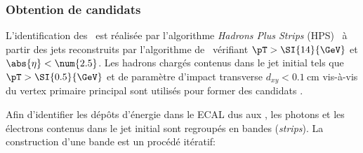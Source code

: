 \subsubsection{Obtention de candidats}
L'identification des \tauh\ est réalisée par l'algorithme \emph{Hadrons Plus Strips} (HPS)~\cite{Khachatryan:2015dfa,Sirunyan:2018pgf} à partir des jets reconstruits par l'algorithme de \PF\ vérifiant $\pT>\SI{14}{\GeV}$ et $\abs{\eta}<\num{2.5}$.
Les hadrons chargés contenus dans le jet initial tels que $\pT>\SI{0.5}{\GeV}$ et de paramètre d'impact transverse $d_{xy}<\SI{0.1}{\centi\meter}$ vis-à-vis du vertex primaire principal sont utilisés pour former des candidats \tauh.
\par
Afin d'identifier les dépôts d'énergie dans le ECAL dus aux \pionnull, les photons et les électrons contenus dans le jet initial sont regroupés en bandes (\emph{strips}).
La construction d'une bande est un procédé itératif:
